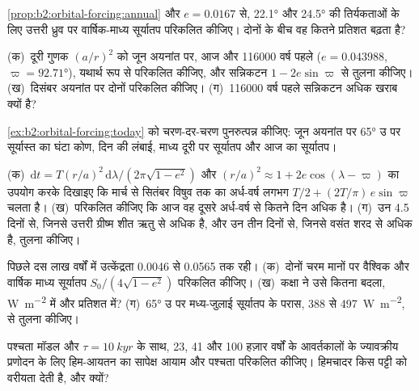 \begin{exercise}[$\star$]\label{exo:b2:orbital-forcing:4}
\cref{prop:b2:orbital-forcing:annual} और $e = 0.0167$ से, \ang{22.1} और \ang{24.5} की तिर्यकताओं के लिए
उत्तरी ध्रुव पर वार्षिक-माध्य सूर्यातप परिकलित कीजिए। दोनों के बीच वह कितने प्रतिशत
बढ़ता है?
\end{exercise}

\begin{exercise}[$\star\star$]\label{exo:b2:orbital-forcing:5}
(क)~दूरी गुणक $(a/r)^2$ को जून अयनांत पर, आज और \num{116000} वर्ष
पहले ($e = 0.043988$, $\varpi = \ang{92.71}$), यथार्थ रूप से परिकलित कीजिए, और सन्निकटन $1 -
2e\sin\varpi$ से तुलना कीजिए। (ख)~दिसंबर अयनांत पर दोनों परिकलित कीजिए। (ग)~\num{116000}
वर्ष पहले सन्निकटन अधिक खराब क्यों है?
\end{exercise}

\begin{exercise}[$\star\star$]\label{exo:b2:orbital-forcing:6}
\cref{ex:b2:orbital-forcing:today} को चरण-दर-चरण पुनरुत्पन्न कीजिए: जून अयनांत पर \ang{65} उ पर
सूर्यास्त का घंटा कोण, दिन की लंबाई, माध्य दूरी पर सूर्यातप और
आज का सूर्यातप।
\end{exercise}

\begin{exercise}[$\star\star$]\label{exo:b2:orbital-forcing:7}
(क)~$\mathrm dt = T(r/a)^2\,\mathrm d\lambda/(2\pi\sqrt{1 - e^2})$ और $(r/a)^2 \approx 1 +
2e\cos(\lambda - \varpi)$ का उपयोग करके दिखाइए कि मार्च से सितंबर विषुव तक का अर्ध-वर्ष
लगभग $T/2 + (2T/\pi)\,e\sin\varpi$ चलता है। (ख)~परिकलित कीजिए कि आज वह दूसरे अर्ध-वर्ष से कितने दिन
अधिक है। (ग)~उन 4.5 दिनों से, जिनसे उत्तरी ग्रीष्म शीत ऋतु से अधिक है, और उन तीन दिनों से, जिनसे
वसंत शरद से अधिक है, तुलना कीजिए।
\end{exercise}

\begin{exercise}[$\star\star$]\label{exo:b2:orbital-forcing:8}
पिछले दस लाख वर्षों में उत्केंद्रता \num{0.0046} से \num{0.0565} तक रही। (क)~दोनों चरम मानों पर
वैश्विक और वार्षिक माध्य सूर्यातप $S_0/(4\sqrt{1 - e^2})$ परिकलित कीजिए। (ख)~कक्षा ने उसे कितना बदला,
\unit{W.m^{-2}} में और प्रतिशत में? (ग)~\ang{65} उ पर मध्य-जुलाई सूर्यातप के परास,
388 से \qty{497}{W.m^{-2}}, से तुलना कीजिए।
\end{exercise}

\begin{exercise}[$\star\star$]\label{exo:b2:orbital-forcing:9}
पश्चता मॉडल और $\tau = \qty{10}{kyr}$ के साथ, 23, 41 और \num{100} हज़ार वर्षों के आवर्तकालों के ज्यावक्रीय प्रणोदन के लिए
हिम-आयतन का सापेक्ष आयाम और पश्चता परिकलित कीजिए। हिमचादर किस पट्टी को
वरीयता देती है, और क्यों?
\end{exercise}

